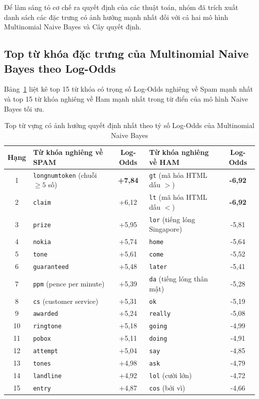 Để làm sáng tỏ cơ chế ra quyết định của các thuật toán, nhóm đã trích xuất danh sách các đặc trưng có ảnh hưởng mạnh nhất đối với cả hai mô hình Multinomial Naive Bayes và Cây quyết định.

\subsection{Top từ khóa đặc trưng của Multinomial Naive Bayes theo Log-Odds}
Bảng~\ref{tab:nb-log-odds} liệt kê top 15 từ khóa có trọng số Log-Odds nghiêng về Spam mạnh nhất và top 15 từ khóa nghiêng về Ham mạnh nhất trong từ điển của mô hình Naive Bayes tối ưu.

\begin{table}[H]
\centering
\caption{Top từ vựng có ảnh hưởng quyết định nhất theo tỷ số Log-Odds của Multinomial Naive Bayes}
\label{tab:nb-log-odds}
\begin{tabular}{|c|l|c||l|c|}
\hline
\textbf{Hạng} & \textbf{Từ khóa nghiêng về SPAM} & \textbf{Log-Odds} & \textbf{Từ khóa nghiêng về HAM} & \textbf{Log-Odds} \\
\hline
1 & \texttt{longnumtoken} (chuỗi $\ge 5$ số) & \textbf{+7,84} & \texttt{gt} (mã hóa HTML dấu $>$) & \textbf{-6,92} \\
\hline
2 & \texttt{claim} & +6,12 & \texttt{lt} (mã hóa HTML dấu $<$) & \textbf{-6,92} \\
\hline
3 & \texttt{prize} & +5,95 & \texttt{lor} (tiếng lóng Singapore) & -5,81 \\
\hline
4 & \texttt{nokia} & +5,74 & \texttt{home} & -5,64 \\
\hline
5 & \texttt{tone} & +5,61 & \texttt{come} & -5,52 \\
\hline
6 & \texttt{guaranteed} & +5,48 & \texttt{later} & -5,41 \\
\hline
7 & \texttt{ppm} (pence per minute) & +5,39 & \texttt{da} (tiếng lóng thân mật) & -5,28 \\
\hline
8 & \texttt{cs} (customer service) & +5,31 & \texttt{ok} & -5,19 \\
\hline
9 & \texttt{awarded} & +5,24 & \texttt{really} & -5,08 \\
\hline
10 & \texttt{ringtone} & +5,18 & \texttt{going} & -4,99 \\
\hline
11 & \texttt{pobox} & +5,11 & \texttt{doing} & -4,91 \\
\hline
12 & \texttt{attempt} & +5,04 & \texttt{say} & -4,85 \\
\hline
13 & \texttt{tones} & +4,98 & \texttt{ask} & -4,79 \\
\hline
14 & \texttt{landline} & +4,92 & \texttt{lol} (cười lớn) & -4,72 \\
\hline
15 & \texttt{entry} & +4,87 & \texttt{cos} (bởi vì) & -4,66 \\
\hline
\end{tabular}
\end{table}

